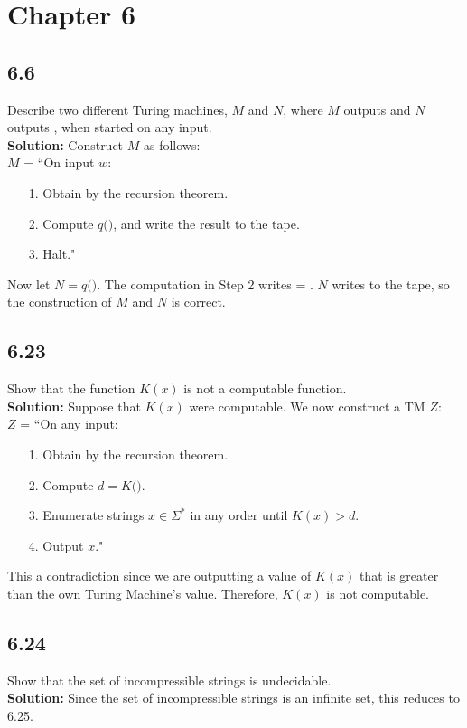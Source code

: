 \section{Chapter 6}

\subsection*{6.6} Describe two different Turing machines, $M$ and $N$, where $M$ outputs  and $N$ outputs , when started on any input.
\\
\textbf{Solution:} Construct $M$ as follows:
\\
$M$ = ``On input $w$:
\begin{enumerate}
\itemsep0em
\item[1.]Obtain  by the recursion theorem.
\item[2.]Compute $q($$)$, and write the result to the tape.
\item[3.]Halt."
\end{enumerate}
Now let $N = q($$)$. The computation in Step 2 writes  = . $N$ writes  to the tape, so the construction of $M$ and $N$ is correct.

\subsection*{6.23} Show that the function $K(x)$ is not a computable function.
\\
\textbf{Solution:} Suppose that $K(x)$ were computable. We now construct a TM $Z$:
\\
$Z$ = ``On any input:
\begin{enumerate}
\itemsep0em
\item[1.]Obtain  by the recursion theorem.
\item[2.]Compute $d = K($$)$.
\item[3.]Enumerate strings $x \in \Sigma^*$ in any order until $K(x) > d$.
\item[4.]Output $x$."
\end{enumerate}
This a contradiction since we are outputting a value of $K(x)$ that is greater than the own Turing Machine's value. Therefore, $K(x)$ is not computable.

\subsection*{6.24} Show that the set of incompressible strings is undecidable.
\\
\textbf{Solution:} Since the set of incompressible strings is an infinite set, this reduces to 6.25.

